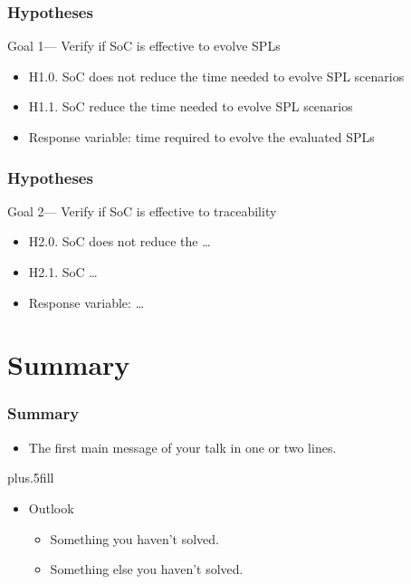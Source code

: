 \documentclass{beamer}
\begin{document}
\begin{frame}
\frametitle{Hypotheses}
 
 \begin{block}{Goal 1--- Verify if SoC is effective to evolve SPLs}
 \begin{itemize}
   \item H1.0. SoC does not reduce the time needed to evolve SPL scenarios 
   \item H1.1. SoC reduce the time needed to evolve SPL scenarios
   \item \alert{Response variable:} time required to evolve the evaluated SPLs	
 \end{itemize}
 \end{block}
\end{frame}

\begin{frame}
\frametitle{Hypotheses}
 \begin{block}{Goal 2--- Verify if SoC is effective to traceability}
 \begin{itemize}
   \item H2.0. SoC does not reduce the \ldots 
   \item H2.1. SoC \ldots
   \item \alert{Response variable:} \ldots	
 \end{itemize}
 \end{block}
\end{frame}

\section*{Summary}

\begin{frame}
\frametitle<presentation>{Summary}

\begin{itemize}
  \item The \alert{first main message} of your talk in one or two lines.
\end{itemize}

\vskip0pt plus.5fill
\begin{itemize}
  \item Outlook
  \begin{itemize}
    \item Something you haven't solved.
    \item Something else you haven't solved.
  \end{itemize}
\end{itemize}
\end{frame}
\end{document}
